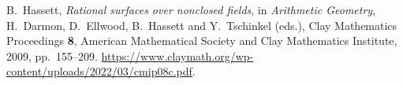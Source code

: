 B.~Hassett, \emph{Rational surfaces over nonclosed fields},
in \emph{Arithmetic Geometry}, H.~Darmon, D.~Ellwood, B.~Hassett and Y.~Tschinkel (eds.),
Clay Mathematics Proceedings \textbf{8}, American Mathematical Society and Clay Mathematics Institute, 2009, pp.~155--209.
\url{https://www.claymath.org/wp-content/uploads/2022/03/cmip08c.pdf}.
